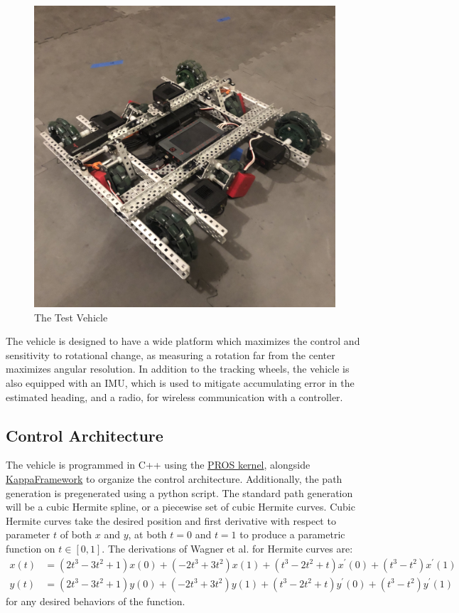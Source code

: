 \documentclass[mla8alt]{mla}
\begin{document}
\begin{paper}
\begin{figure}[H]
\includegraphics[width=0.6\linewidth]{TestVehicle}
\captionsetup{justification=centering}
\caption{The Test Vehicle}
\label{img:tv1}
\end{figure}

The vehicle is designed to have a wide platform which maximizes the control and sensitivity to rotational change, as measuring a rotation far from the center maximizes angular resolution. In addition to the tracking wheels, the vehicle is also equipped with an IMU, which is used to mitigate accumulating error in the estimated heading, and a radio, for wireless communication with a controller.

\subsection{Control Architecture}

The vehicle is programmed in C++ using the \href{https://github.com/purduesigbots/pros}{PROS kernel}, alongside \href{https://github.com/SpencerJ21/KappaFramework}{KappaFramework} to organize the control architecture. Additionally, the path generation is pregenerated using a python script. The standard path generation will be a cubic Hermite spline, or a piecewise set of cubic Hermite curves. Cubic Hermite curves take the desired position and first derivative with respect to parameter $t$ of both $x$ and $y$, at both $t=0$ and $t=1$ to produce a parametric function on $t\in[0,1]$. The derivations of Wagner et al. for Hermite curves are:
\begin{subequations}
\begin{align}
x(t)&=(2t^3-3t^2+1)x(0)+(-2t^3+3t^2)x(1)+(t^3-2t^2+t)x^\prime(0)+(t^3-t^2)x^\prime(1) \\
y(t)&=(2t^3-3t^2+1)y(0)+(-2t^3+3t^2)y(1)+(t^3-2t^2+t)y^\prime(0)+(t^3-t^2)y^\prime(1)
\end{align}
\end{subequations}
for any desired behaviors of the function.


\end{paper}
\end{document}

